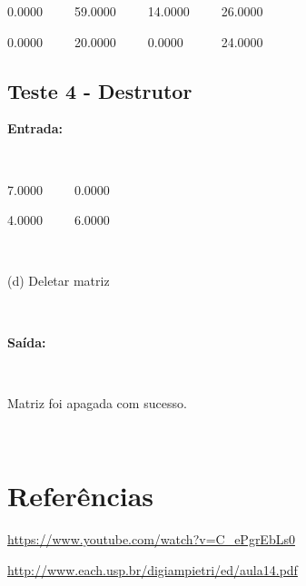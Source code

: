 \documentclass{article}
\begin{document}
0.0000~~~~~59.0000~~~~~14.0000~~~~~26.0000

0.0000~~~~~20.0000~~~~~0.0000~~~~~~24.0000

\subsection{Teste 4 - Destrutor}

\textbf{Entrada:}

~~~~~~~~~~~~~~~

7.0000~~~~~0.0000

4.0000~~~~~6.0000

~~~~~~~~~~~~~~

(d) Deletar matriz

~~~~~~~~~~~~~~

\textbf{Saída:}

~~~~~~~~~~~~~~

Matriz foi apagada com sucesso.

~~~~~~~~~~~~~~~

\section{Referências}

\url{https://www.youtube.com/watch?v=C_ePgrEbLs0}

\url{http://www.each.usp.br/digiampietri/ed/aula14.pdf}
\end{document}
